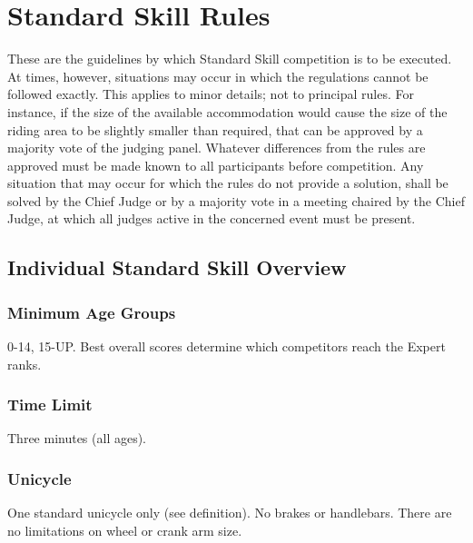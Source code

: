 


\chapter{Standard Skill Rules \label{chap:freestyle_std-skill-rules}}

These are the guidelines by which Standard Skill competition is to be executed.
At times, however, situations may occur in which the regulations cannot be followed exactly.
This applies to minor details; not to principal rules.
For instance, if the size of the available accommodation would cause the size of the riding area to be slightly smaller than required, that can be approved by a majority vote of the judging panel.
Whatever differences from the rules are approved must be made known to all participants before competition.
Any situation that may occur for which the rules do not provide a solution, shall be solved by the Chief Judge or by a majority vote in a meeting chaired by the Chief Judge, at which all judges active in the concerned event must be present.

\section{Individual Standard Skill Overview}

\subsection{Minimum Age Groups}
0-14, 15-UP.
Best overall scores determine which competitors reach the Expert ranks.

\subsection{Time Limit}
Three minutes (all ages).

\subsection{Unicycle}
One standard unicycle only (see definition).
No brakes or handlebars.
There are no limitations on wheel or crank arm size.

